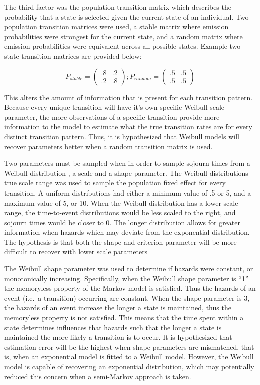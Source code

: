 \documentclass[12pt]{./styles/outhesis}
\begin{document}
The third factor was the population transition matrix which describes
the probability that a state is selected given the current state of an
individual. Two population transition matrices were used, a stable
matrix where emission probabilities were strongest for the current
state, and a random matrix where emission probabilities were equivalent
across all possible states. Example two-state transition matrices are
provided below:

\[
P_{stable} = \begin{pmatrix} .8 & .2 \\ .2  & .8 \end{pmatrix}
;
P_{random} = \begin{pmatrix} .5 & .5 \\ .5  & .5 \end{pmatrix}
\]

This alters the amount of information that is present for each
transition pattern. Because every unique transition will have it's own
specific Weibull scale parameter, the more observations of a specific
transition provide more information to the model to estimate what the
true transition rates are for every distinct transition pattern. Thus,
it is hypothesized that Weibull models will recover parameters better
when a random transition matrix is used.

Two parameters must be sampled when in order to sample sojourn times from
a Weibull distribution , a scale and a shape parameter. The Weibull
distributions true scale range was used to sample the population fixed
effect for every transition. A uniform distributions had either a
minimum value of .5 or 5, and a maximum value of 5, or 10. When the
Weibull distribution has a lower scale range, the time-to-event
distributions would be less scaled to the right, and sojourn times would
be closer to 0. The longer distribution allows for greater information
when hazards which may deviate from the exponential distribution. The
hypothesis is that both the shape and criterion parameter will be more
difficult to recover with lower scale parameters

The Weibull shape parameter was used to determine if hazards were
constant, or monotonically increasing. Specifically, when the Weibull
shape parameter is ``1'' the memoryless property of the Markov model is
satisfied. Thus the hazards of an event (i.e.~a transition) occurring
are constant. When the shape parameter is 3, the hazards of an event
increase the longer a state is maintained, thus the memoryless property
is not satisfied. This means that the time spent within a state
determines influences that hazards such that the longer a state is
maintained the more likely a transition is to occur. It is hypothesized
that estimation error will be the highest when shape parameters are
mismatched, that is, when an exponential model is fitted to a Weibull
model. However, the Weibull model is capable of recovering an
exponential distribution, which may potentially reduced this concern
when a semi-Markov approach is taken.
\end{document}
